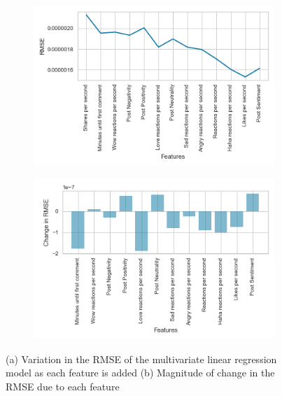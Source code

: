 \documentclass[twoside]{article}
\begin{document}
\begin{figure}[htp]
\centering
    \begin{subfigure}{0.9\textwidth}
      \includegraphics[scale=0.9]{mse_stepwise}
      \caption{}
    \end{subfigure}%
    \par
    \begin{subfigure}{0.9\textwidth}
      \includegraphics[scale=0.9]{mse_stepwise_change}
      \caption{}
    \end{subfigure}
  \caption { (a) Variation in the RMSE of the multivariate linear regression model as each feature is added (b) Magnitude of change in the RMSE due to each feature }\label{fig:g}
\end{figure}
\clearpage
\end{document}
